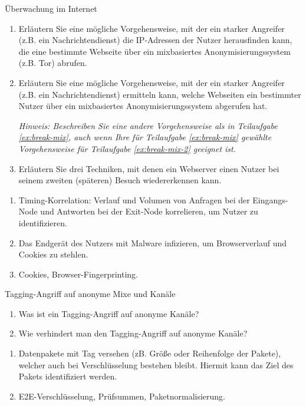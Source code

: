 \documentclass{article}
\begin{document}
\setcounter{subsection}{238}
\begin{exercise}{Überwachung im Internet}
  \begin{enumerate}
    \item\label{ex:break-mix} Erläutern Sie eine mögliche Vorgehensweise, mit der ein starker Angreifer (z.B. ein Nachrichtendienst) die IP-Adressen der Nutzer herausfinden kann, die eine bestimmte Webseite über ein mixbasiertes Anonymisierungssystem (z.B. Tor) abrufen.
    \item\label{ex:break-mix-2} Erläutern Sie eine mögliche Vorgehensweise, mit der ein starker Angreifer (z.B. ein Nachrichtendienst) ermitteln kann, welche Webseiten ein bestimmter Nutzer über ein mixbasiertes Anonymisierungssystem abgerufen hat.
      \par\textit{Hinweis: Beschreiben Sie eine andere Vorgehensweise als in Teilaufgabe \ref{ex:break-mix}, auch wenn Ihre für Teilaufgabe \ref{ex:break-mix} gewählte Vorgehensweise für Teilaufgabe \ref{ex:break-mix-2} geeignet ist.}
    \item Erläutern Sie drei Techniken, mit denen ein Webserver einen Nutzer bei seinem zweiten (späteren) Besuch wiedererkennen kann.
  \end{enumerate}

  \begin{solution}
    \begin{enumerate}
      \item Timing-Korrelation: Verlauf und Volumen von Anfragen bei der Eingangs-Node und Antworten bei der Exit-Node korrelieren, um Nutzer zu identifizieren.
      \item Das Endgerät des Nutzers mit Malware infizieren, um Browserverlauf und Cookies zu stehlen.
      \item Cookies, Browser-Fingerprinting.
    \end{enumerate}
  \end{solution}
\end{exercise}

\setcounter{subsection}{2310}
\begin{exercise}{Tagging-Angriff auf anonyme Mixe und Kanäle}
  \begin{enumerate}
    \item Was ist ein Tagging-Angriff auf anonyme Kanäle?
    \item Wie verhindert man den Tagging-Angriff auf anonyme Kanäle?
  \end{enumerate}

  \begin{solution}
    \begin{enumerate}
      \item Datenpakete mit Tag versehen (zB. Größe oder Reihenfolge der Pakete), welcher auch bei Verschlüsselung bestehen bleibt. Hiermit kann das Ziel des Pakets identifiziert werden.
      \item E2E-Verschlüsselung, Prüfsummen, Paketnormalisierung.
    \end{enumerate}
  \end{solution}
\end{exercise}
\end{document}
